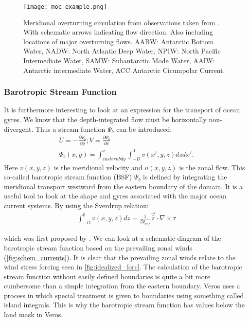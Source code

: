 \begin{multicols}{2}
 \begin{figure}[H]
	\texttt{[image: moc\_example.png]}
	\caption{Meridional overturning circulation from observations taken from \cite{Forget2015Oct}. With schematic arrows indicating flow direction. Also including locations of major overturning flows. AABW: Antarctic Bottom Water, NADW: North Atlantic Deep Water, NPIW: North Pacific Intermediate Water,  SAMW: Subantarctic Mode Water, AAIW: Antarctic intermediate Water, ACC Antarctic Cicumpolar Current.}
	\label{fig:moc_ex}
\end{figure}

\subsubsection{Barotropic Stream Function} \label{sec:BSF_theory}
It is furthermore interesting to look at an expression for the transport of ocean gyres. We know that the depth-integrated flow must be horizontally non-divergent. Thus a stream function $\Psi_{b}$ can be introduced:
\begin{align}
U = -\frac{\partial \Psi_{b}}{\partial y}; V=\frac{\partial \Psi_{b}}{\partial x} \label{eq:psiv} \\
\Psi_{b}(x, y) = \int_{eastern bdy}^{x} \int_{-D}^{0} v(x',y,z) dz dx'.
\end{align}
Here $v(x,y,z)$ is the meridional velocity and $u(x,y,z)$ is the zonal flow.
This so-called barotropic stream function (BSF) $\Psi_{b}$ is defined by integrating the meridional transport westward from the eastern boundary of the domain. It is a useful tool to look at the shape and gyres associated with the major ocean current systems. By using the Sverdrup relation:
\begin{align}
	\int_{-D}^{0}v(x,y,z) dz = \frac{1}{\beta \rho_{ref}}\vec{\hat{z}}\cdot \nabla \times \tau
\end{align}

which was first proposed by \cite{sverdrup1947wind}. We can look at a schematic diagram of the barotropic stream function based on the prevailing zonal winds (\cref{fig:schem_currents}). It is clear that the prevailing zonal winds relate to the wind stress forcing seen in \cref{fig:idealized_forc}. The calculation of the barotropic stream function without easily defined boundaries is quite a bit more cumbersome than a simple integration from the eastern boundary. Veros uses a process in which special treatment is given to boundaries using something called island integrals. This is why the barotropic stream function has values below the land mask in Veros. 
 

\end{multicols}
